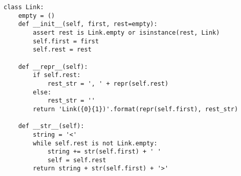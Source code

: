 \begin{lstlisting}
class Link:
    empty = ()
    def __init__(self, first, rest=empty):
        assert rest is Link.empty or isinstance(rest, Link)
        self.first = first
        self.rest = rest

    def __repr__(self):
        if self.rest:
            rest_str = ', ' + repr(self.rest)
        else:
            rest_str = ''
        return 'Link({0}{1})'.format(repr(self.first), rest_str)

    def __str__(self):
        string = '<'
        while self.rest is not Link.empty:
            string += str(self.first) + ' '
            self = self.rest
        return string + str(self.first) + '>'
\end{lstlisting}
